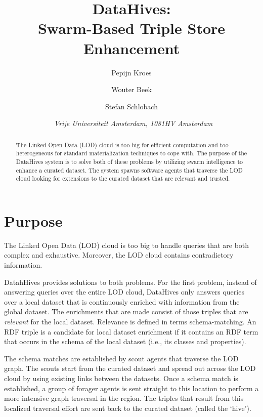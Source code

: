 \documentclass{article}
\title{\textbf{\huge DataHives:\\
    Swarm-Based Triple Store Enhancement}}
\author{Pepijn Kroes \affila \and
    Wouter Beek \affilb \and
    Stefan Schlobach \affila}
\date{\affila\ \textit{Vrije Universiteit Amsterdam, 1081HV Amsterdam}}
\begin{document}
\ttl
\thispagestyle{empty}

\begin{abstract}
\noindent
The Linked Open Data (LOD) cloud is too big for efficient computation
and too heterogeneous for standard materialization techniques to cope with.
The purpose of the DataHives system is to solve both of these problems
by utilizing swarm intelligence to enhance a curated dataset.
The system spawns software agents that traverse the LOD cloud
looking for extensions to the curated dataset that are relevant and trusted.
\end{abstract}


\section{Purpose}

The Linked Open Data (LOD) cloud is too big to handle queries that are both
  complex and exhaustive.
Moreover, the LOD cloud contains contradictory information.

DatahHives provides solutions to both problems.
For the first problem, instead of answering queries over the entire
  LOD cloud, DataHives only answers queries over a local dataset
  that is continuously enriched with information from the global
  dataset.
The enrichments that are made consist of those triples that are
  \emph{relevant} for the local dataset.
Relevance is defined in terms schema-matching.
An RDF triple is a candidate for local dataset enrichment if it contains
  an RDF term that occurs in the schema of the local dataset
  (i.e., its classes and properties).

The schema matches are established by scout agents that traverse
  the LOD graph.
The scouts start from the curated dataset and spread out across the
  LOD cloud by using existing links between the datasets.
Once a schema match is established, a group of forager agents is sent
  straight to this location to perform a more intensive graph traversal
  in the region.
The triples that result from this localized traversal effort
  are sent back to the curated dataset (called the `hive').
\end{document}
